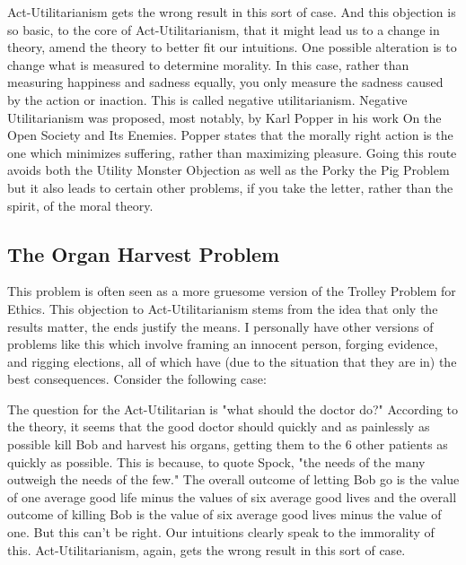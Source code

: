Act-Utilitarianism gets the wrong result in this sort of case. And this objection is so basic, to the core of Act-Utilitarianism, that it might lead us to a change in theory, amend the theory to better fit our intuitions. One possible alteration is to change what is measured to determine morality. In this case, rather than measuring happiness and sadness equally, you only measure the sadness caused by the action or inaction. This is called negative utilitarianism. Negative Utilitarianism was proposed, most notably, by Karl Popper in his work On the Open Society and Its Enemies. Popper states that the morally right action is the one which minimizes suffering, rather than maximizing pleasure. Going this route avoids both the Utility Monster Objection as well as the Porky the Pig Problem but it also leads to certain other problems, if you take the letter, rather than the spirit, of the moral theory. 

\subsection{The Organ Harvest Problem}

This problem is often seen as a more gruesome version of the Trolley Problem for Ethics. This objection to Act-Utilitarianism stems from the idea that only the results matter, the ends justify the means. I personally have other versions of problems like this which involve framing an innocent person, forging evidence, and rigging elections, all of which have (due to the situation that they are in) the best consequences. Consider the following case:


The question for the Act-Utilitarian is "what should the doctor do?" According to the theory, it seems that the good doctor should quickly and as painlessly as possible kill Bob and harvest his organs, getting them to the 6 other patients as quickly as possible. This is because, to quote Spock, "the needs of the many outweigh the needs of the few." The overall outcome of letting Bob go is the value of one average good life minus the values of six average good lives and the overall outcome of killing Bob is the value of six average good lives minus the value of one. But this can't be right. Our intuitions clearly speak to the immorality of this.  Act-Utilitarianism, again, gets the wrong result in this sort of case. 

